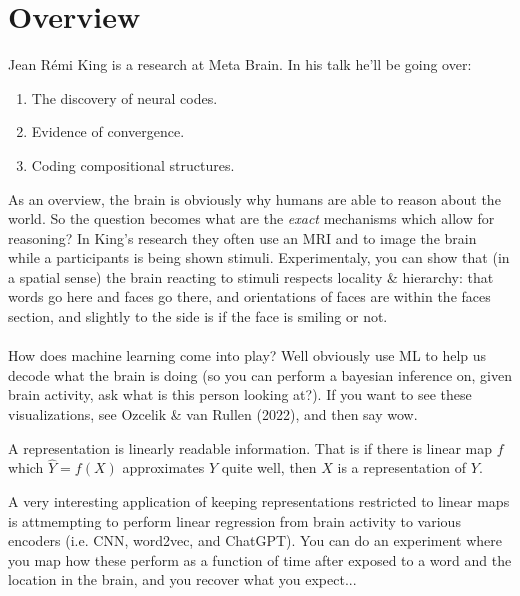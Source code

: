 \section{Overview}
Jean R\'emi King is a research at Meta Brain. In his talk he'll be going over:
\begin{enumerate}
	\item The discovery of neural codes.
	\item Evidence of convergence.
	\item Coding compositional structures.
\end{enumerate}
As an overview, the brain is obviously why humans are able to reason about the world. So the question becomes what are the \textit{exact} mechanisms which allow for reasoning? In King's research they often use an MRI and to image the brain while a participants is being shown stimuli. Experimentaly, you can show that (in a spatial sense) the brain reacting to stimuli respects locality \& hierarchy: that words go here and faces go there, and orientations of faces are within the faces section, and slightly to the side is if the face is smiling or not.\\
\\
How does machine learning come into play? Well obviously use ML to help us decode what the brain is doing (so you can perform a bayesian inference on, given brain activity, ask what is this person looking at?). If you want to see these visualizations, see Ozcelik \& van Rullen (2022), and then say wow.

\begin{definition}
	 A representation is linearly readable information. That is if there is linear map $f$ which $\hat Y = f(X)$  approximates $Y$ quite well, then $X$ is a representation of $Y$.
\end{definition}
A very interesting application of keeping representations restricted to linear maps is attmempting to perform linear regression from brain activity to various encoders (i.e. CNN, word2vec, and ChatGPT). You can do an experiment where you map how these perform as a function of time after exposed to a word and the location in the brain, and you recover what you expect...









